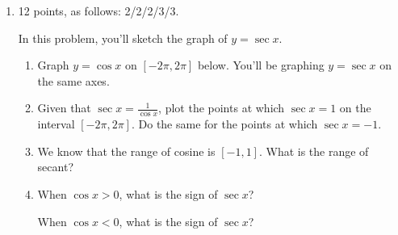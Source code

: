 \documentclass{article}
\begin{document}
\begin{enumerate}
\pspace{\newpage}


\item 

\begin{grading}
12 points, as follows: 2/2/2/3/3.
\end{grading}

\begin{problem}
In this problem, you'll sketch the graph of $y=\sec x$.
\begin{enumerate}
  \item 
  Graph $y=\cos x$ on $[-2\pi, 2\pi]$ below.
  You'll be graphing $y=\sec x$ on the same axes.


  \item 
  \begin{problem}
  Given that $\sec x = \frac{1}{\cos x}$, plot the points at which $\sec x = 1$
  on the interval $[-2\pi, 2\pi]$. Do the same for the points at which $\sec x = -1$.
  \end{problem}

  \item 
  \begin{problem}
  We know that the range of cosine is $[-1,1]$. What is the range of secant?
  \end{problem}

  \pspace{36pt}

  \item
  \begin{problem}
  When $\cos x > 0$, what is the sign of $\sec x$?
  \end{problem}
  \pspace{36pt}

  \begin{problem}
  When $\cos x < 0$, what is the sign of $\sec x$?
  \end{problem}
  \pspace{36pt}


\end{enumerate}
\end{problem}
\end{enumerate}
\end{document}
